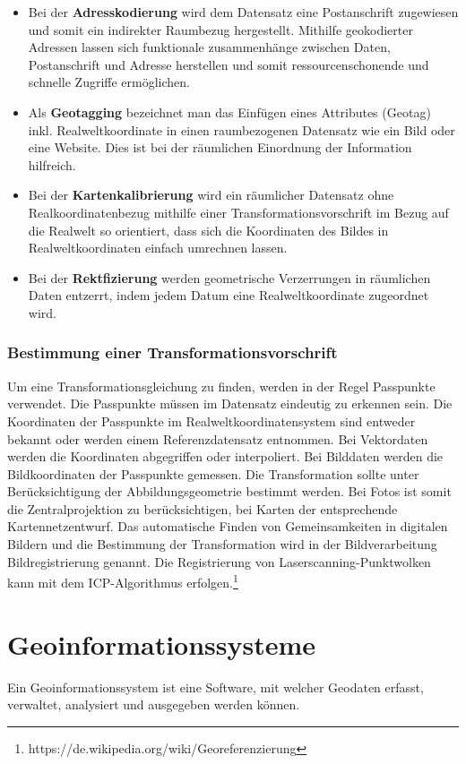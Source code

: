 \documentclass[11pt,ceqn]{book}
\begin{document}
\begin{itemize}
\item Bei der \textbf{Adresskodierung} wird dem Datensatz eine Postanschrift zugewiesen und somit ein indirekter Raumbezug hergestellt. Mithilfe geokodierter Adressen lassen sich funktionale zusammenhänge zwischen Daten, Postanschrift und Adresse herstellen und somit ressourcenschonende und schnelle Zugriffe ermöglichen.
\item Als \textbf{Geotagging} bezeichnet man das Einfügen eines Attributes (Geotag) inkl. Realweltkoordinate in einen raumbezogenen Datensatz wie ein Bild oder eine Website. Dies ist bei der räumlichen Einordnung der Information hilfreich.
\item Bei der \textbf{Kartenkalibrierung} wird ein räumlicher Datensatz ohne Realkoordinatenbezug mithilfe einer Transformationsvorschrift im Bezug auf die Realwelt so orientiert, dass sich die Koordinaten des Bildes in Realweltkoordinaten einfach umrechnen lassen.
\item Bei der \textbf{Rektfizierung} werden geometrische Verzerrungen in räumlichen Daten entzerrt, indem jedem Datum eine Realweltkoordinate zugeordnet wird.
\end{itemize}


\subsubsection{Bestimmung einer Transformationsvorschrift}

Um eine Transformationsgleichung zu finden, werden in der Regel Passpunkte verwendet. Die Passpunkte müssen im Datensatz eindeutig zu erkennen sein. Die Koordinaten der Passpunkte im Realweltkoordinatensystem sind entweder bekannt oder werden einem Referenzdatensatz entnommen. Bei Vektordaten werden die Koordinaten abgegriffen oder interpoliert. Bei Bilddaten werden die Bildkoordinaten der Passpunkte gemessen. Die Transformation sollte unter Berücksichtigung der Abbildungsgeometrie bestimmt werden. Bei Fotos ist somit die Zentralprojektion zu berücksichtigen, bei Karten der entsprechende Kartennetzentwurf. Das automatische Finden von Gemeinsamkeiten in digitalen Bildern und die Bestimmung der Transformation wird in der Bildverarbeitung Bildregistrierung genannt. Die Registrierung von Laserscanning-Punktwolken kann mit dem ICP-Algorithmus erfolgen.\footnote{https://de.wikipedia.org/wiki/Georeferenzierung}


\section{Geoinformationssysteme}
Ein Geoinformationssystem ist eine Software, mit welcher Geodaten erfasst, verwaltet, analysiert und ausgegeben werden können.
\end{document}
